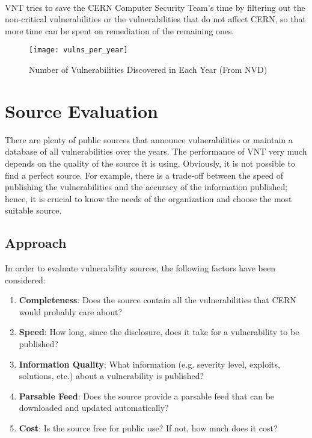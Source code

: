 \paragraph{}
VNT tries to save the CERN Computer Security Team's time by filtering out the non-critical vulnerabilities or the vulnerabilities that do not affect CERN, so that more time can be spent on remediation of the remaining ones.


\begin{figure}[h!]
\label{figure:vulns_per_year}
  \centering
    \texttt{[image: vulns\_per\_year]}
  \caption{Number of Vulnerabilities Discovered in Each Year (From NVD)}
  
\end{figure}

%

\section{Source Evaluation}
\label{source_evaluation}
There are plenty of public sources that announce vulnerabilities or maintain a database of all vulnerabilities over the years. The performance of VNT very much depends on the quality of the source it is using. Obviously, it is not possible to find a perfect source. For example, there is a trade-off between the speed of publishing the vulnerabilities and the accuracy of the information published; hence, it is crucial to know the needs of the organization and choose the most suitable source.

\subsection{Approach}
In order to evaluate vulnerability sources, the following factors have been considered:
\begin{enumerate}
\item \textbf{Completeness}: Does the source contain all the vulnerabilities that CERN would probably care about? 
\item \textbf{Speed}: How long, since the disclosure, does it take for a vulnerability to be published?
\item \textbf{Information Quality}: What information (e.g. severity level, exploits, solutions, etc.) about a vulnerability is published?
\item \textbf{Parsable Feed}: Does the source provide a parsable feed that can be downloaded and updated automatically?
\item \textbf{Cost}: Is the source free for public use? If not, how much does it cost?
\end{enumerate} 

